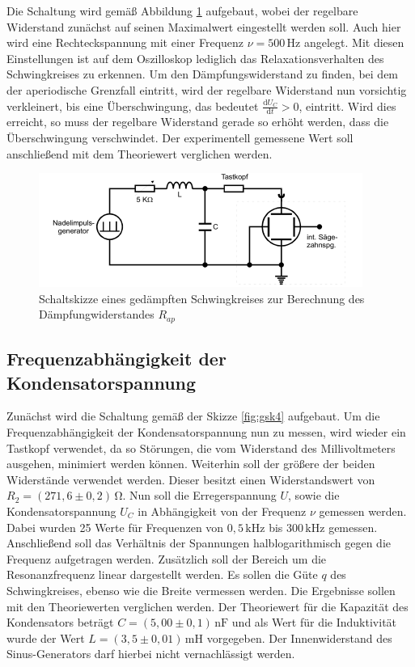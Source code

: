 Die Schaltung wird gemäß Abbildung \ref{fig:gsk3} aufgebaut, wobei der regelbare Widerstand zunächst
auf seinen Maximalwert eingestellt werden soll. Auch hier wird eine Rechteckspannung mit einer
Frequenz $\nu = 500\, \si{\hertz}$ angelegt. Mit diesen Einstellungen ist auf dem Oszilloskop
lediglich das Relaxationsverhalten des Schwingkreises zu erkennen. Um den Dämpfungswiderstand 
zu finden, bei dem der aperiodische Grenzfall eintritt, wird der regelbare Widerstand nun vorsichtig
verkleinert, bis eine Überschwingung, das bedeutet $\frac{\mathrm{d}U_C}{\mathrm{d}t} > 0$, eintritt.
Wird dies erreicht, so muss der regelbare Widerstand gerade so erhöht werden, dass die Überschwingung
verschwindet. Der experimentell gemessene Wert soll anschließend mit dem Theoriewert verglichen werden.

\begin{figure}[H]
  \centering
  \includegraphics{content/aufgabeB.png}
  \caption{Schaltskizze eines gedämpften Schwingkreises zur Berechnung des Dämpfungwiderstandes $R_{ap}$ \cite{sample354}}
  \label{fig:gsk3}
\end{figure}


\subsection{Frequenzabhängigkeit der Kondensatorspannung}

Zunächst wird die Schaltung gemäß der Skizze \ref{fig:gsk4} aufgebaut. Um die Frequenzabhängigkeit 
der Kondensatorspannung nun zu messen, wird wieder ein Tastkopf verwendet, da so Störungen, die vom Widerstand
des Millivoltmeters ausgehen, minimiert werden können. Weiterhin soll der größere der beiden Widerstände verwendet werden. Dieser 
besitzt einen Widerstandswert von $R_2 = (271,6 \pm 0,2)\, \si{\ohm}$. 
Nun soll die Erregerspannung $U$, sowie die Kondensatorspannung $U_C$ in Abhängigkeit von der Frequenz $\nu$
gemessen werden. Dabei wurden 25 Werte für Frequenzen von $0,5\,\si{\kilo\hertz}$ bis $300\,\si{\kilo\hertz}$ gemessen. 
Anschließend soll das Verhältnis der Spannungen halblogarithmisch gegen die Frequenz aufgetragen werden.
Zusätzlich soll der Bereich um die Resonanzfrequenz linear dargestellt werden. Es sollen die Güte $q$ des
Schwingkreises, ebenso wie die Breite vermessen werden. Die Ergebnisse sollen mit den Theoriewerten 
verglichen werden. Der Theoriewert für die Kapazität des Kondensators beträgt $C = (5,00 \pm 0,1)\, \si{\nano\farad}$
und als Wert für die Induktivität wurde der Wert $L = (3,5 \pm 0,01)\, \si{\milli\henry}$ vorgegeben.
Der Innenwiderstand des Sinus-Generators darf hierbei nicht vernachlässigt werden.


